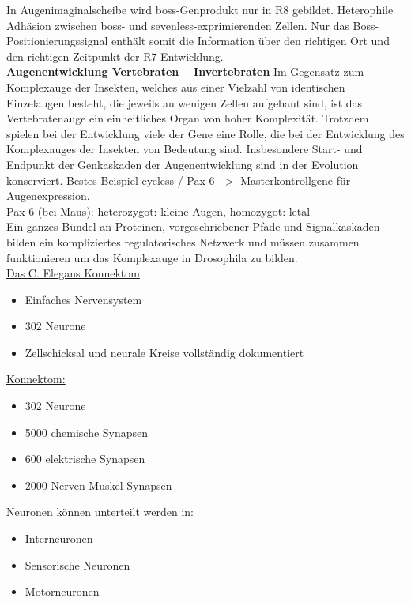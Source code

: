 In Augenimaginalscheibe wird boss-Genprodukt nur in R8 gebildet. Heterophile Adhäsion zwischen boss- und sevenless-exprimierenden Zellen. Nur das Boss-Positionierungssignal enthält somit die Information über den richtigen Ort und den richtigen Zeitpunkt der R7-Entwicklung.\\

\textbf{Augenentwicklung Vertebraten – Invertebraten}
Im Gegensatz zum Komplexauge der Insekten, welches aus einer Vielzahl von identischen Einzelaugen besteht, die jeweils au wenigen Zellen aufgebaut sind, ist das Vertebratenauge ein einheitliches Organ von hoher Komplexität. Trotzdem spielen bei der Entwicklung viele der Gene eine Rolle, die bei der Entwicklung des Komplexauges der Insekten von Bedeutung sind. Insbesondere Start- und Endpunkt der Genkaskaden der Augenentwicklung sind in der Evolution konserviert. Bestes Beispiel eyeless / Pax-6 -$>$ Masterkontrollgene für Augenexpression.\\
Pax 6 (bei Maus): heterozygot: kleine Augen, homozygot: letal\\

Ein ganzes Bündel an Proteinen, vorgeschriebener Pfade und Signalkaskaden bilden ein kompliziertes regulatorisches Netzwerk und müssen zusammen funktionieren um das Komplexauge in Drosophila zu bilden.\\

\underline{Das C. Elegans Konnektom}
\begin{itemize}
	\item Einfaches Nervensystem
	\item 302 Neurone
	\item Zellschicksal und neurale Kreise vollständig dokumentiert
\end{itemize}

\underline{Konnektom:}
\begin{itemize}
	\item 302 Neurone
	\item 5000 chemische Synapsen
	\item 600 elektrische Synapsen
	\item 2000 Nerven-Muskel Synapsen
\end{itemize}

\underline{Neuronen können unterteilt werden in:}
\begin{itemize}
	\item Interneuronen
	\item Sensorische Neuronen
	\item Motorneuronen
\end{itemize}

